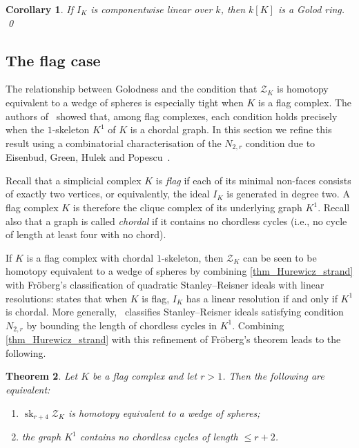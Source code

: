 \documentclass[a4paper,10pt]{amsart}
\newtheorem{theorem}{Theorem}[section]
\newtheorem{corollary}[theorem]{Corollary}
\theoremstyle{definition}
\theoremstyle{remark}
\begin{document}
\begin{corollary}
If $I_K$ is componentwise linear over $k$, then $k[K]$ is a Golod ring. \qed
\end{corollary}


\subsection*{The flag case}

The relationship between Golodness and the condition that $\mathcal{Z}_K$ is homotopy equivalent to a wedge of spheres is especially tight when $K$ is a flag complex. The authors of~\cite{GPTW} showed that, among flag complexes, each condition holds
precisely when the $1$-skeleton $K^1$ of $K$ is a chordal graph. In this section we refine this result using a combinatorial characterisation of the $N_{2,r}$ condition due to Eisenbud, Green, Hulek and Popescu~\cite{EGHP}.

Recall that a simplicial complex $K$ is \emph{flag} if each of its minimal non-faces consists of exactly two vertices, or equivalently, the ideal $I_K$ is generated in degree two. A flag complex $K$ is therefore the clique complex of its underlying graph $K^1$. Recall also that a graph is called \emph{chordal} if it contains no chordless cycles (i.e., no cycle of length at least four with no chord).

If $K$ is a flag complex with chordal $1$-skeleton, then $\mathcal{Z}_K$ can be seen to be homotopy equivalent to a wedge of spheres by combining \cref{thm_Hurewicz_strand} with Fr\"oberg's classification of quadratic Stanley--Reisner ideals with linear resolutions: \cite[Theorem~1]{Fro} states that when $K$ is flag, $I_K$ has a linear resolution if and only if $K^1$ is chordal. More generally,~\cite[Theorem~2.1]{EGHP} classifies Stanley--Reisner ideals satisfying condition $N_{2,r}$ by bounding the length of chordless cycles in $K^1$. Combining \cref{thm_Hurewicz_strand} with this refinement of Fr\"oberg's theorem leads to the following.

\begin{theorem} \label{thm_flag}
Let $K$ be a flag complex and let $r>1$. Then the following are equivalent:
\begin{enumerate}[label={\normalfont(\alph*)}]
\item $\operatorname{sk}_{r+4}\mathcal{Z}_K$ is homotopy equivalent to a wedge of spheres;
\item the graph $K^1$ contains no chordless cycles of length $\leqslant r+2$.
\end{enumerate}
\end{theorem}
\end{document}

